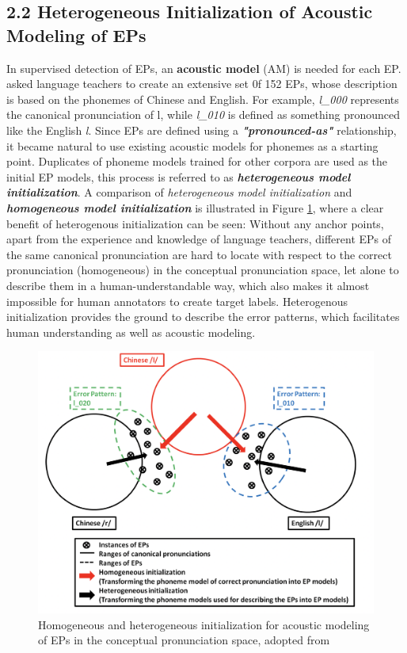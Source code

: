 \documentclass[nobib]{tufte-handout}
\begin{document}
\subsection{2.2 \textbf{Heterogeneous Initialization of Acoustic Modeling of EPs}}

In supervised detection of EPs, an \textbf{acoustic model} (AM) is needed for each EP. \cite{wang2015supervised} asked language teachers to create an extensive set 0f 152 EPs, whose description is based on the phonemes of Chinese and English. For example, \textit{l\_000} represents the canonical pronunciation of l, while \textit{l\_010} is defined as something pronounced like the English \textit{l}. Since EPs are defined using a  \textbf{\textit{"pronounced-as"}} relationship, it became natural to use existing acoustic models for phonemes as a starting point. Duplicates of phoneme models trained for other corpora are used as the initial EP models, this process is referred to as \textbf{\textit{heterogeneous model initialization}}. A comparison of \textit{heterogeneous model initialization} and \textbf{\textit{homogeneous model initialization}} is illustrated in Figure \ref{fig:init}, where a clear benefit of heterogenous initialization can be seen: Without any anchor points, apart from the experience and knowledge of language teachers, different EPs of the same canonical pronunciation are hard to locate with respect to the correct pronunciation (homogeneous) in the conceptual pronunciation space, let alone to describe them in a human-understandable way, which also makes it almost impossible for human annotators to create target labels. Heterogenous initialization provides the ground to describe the error patterns, which facilitates human understanding as well as acoustic modeling.

\begin{figure}
  \includegraphics{init.png}
  \caption{Homogeneous and heterogeneous initialization for acoustic modeling
of EPs in the conceptual pronunciation space, adopted from \cite{wang2015supervised}}
  \label{fig:init}
\end{figure}
\end{document}
